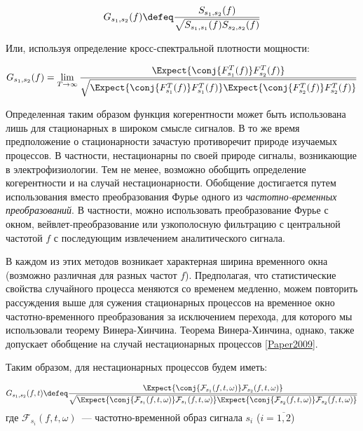 \begin{equation}
    G_{s_1,s_2}(f) \defeq \frac{S_{s_1,s_2}(f)}{\sqrt{S_{s_1,s_1}(f)S_{s_2,s_2}(f)}}
    \label{def_coh}
\end{equation}

Или, используя определение кросс-спектральной плотности мощности:

\begin{equation}
    G_{s_1,s_2}(f) = \lim_{T \to \infty}
    \frac{\Expect{\conj{F_{s_1}^T(f)}F_{s_2}^T(f)}}
    {\sqrt{\Expect{\conj{F_{s_1}^T(f)}F_{s_1}^T(f)}
    \Expect{\conj{F_{s_2}^T(f)}F_{s_2}^T(f)}}}
\end{equation}

Определенная таким образом функция когерентности может быть использована лишь
для стационарных в широком смысле сигналов.  В то же время предположение о
стационарности зачастую противоречит природе изучаемых процессов. В частности,
нестационарны по своей природе сигналы, возникающие в электрофизиологии.  Тем
не менее, возможно обобщить определение когерентности и на случай
нестационарности.  Обобщение достигается путем использования вместо
преобразования Фурье одного из \emph{частотно-временных преобразований}.  В
частности, можно использовать преобразование Фурье с окном,
вейвлет-преобразование или узкополосную фильтрацию с центральной частотой $f$ с
последующим извлечением аналитического сигнала.

В каждом из этих методов возникает характерная ширина временного окна (возможно
различная для разных частот $f$).  Предполагая, что статистические свойства
случайного процесса меняются со временем медленно, можем повторить рассуждения
выше для сужения стационарных процессов на временное окно частотно-временного
преобразования за исключением перехода, для которого мы использовали теорему
Винера-Хинчина.  Теорема Винера-Хинчина, однако, также допускает обобщение на
случай нестационарных процессов \ref{Paper2009}.

Таким образом, для нестационарных процессов будем иметь:

\begin{equation}
    G_{s_1,s_2}(f,t) \defeq
    \frac{\Expect{\conj{\mathcal{F}_{s_1}(f,t,\omega)}\mathcal{F}_{s_2}(f,t,\omega)}}
    {\sqrt{\Expect{\conj{\mathcal{F}_{s_1}(f,t,\omega)}\mathcal{F}_{s_1}(f,t,\omega)}
    \Expect{\conj{\mathcal{F}_{s_2}(f,t,\omega)}\mathcal{F}_{s_2}(f,t,\omega)}}}
    \label{nonwss_coh_def}
\end{equation}
где $\mathcal{F}_{s_i}(f,t,\omega)$~--- частотно-временной образ сигнала $s_i$ ($i=\overline{1,2}$)

